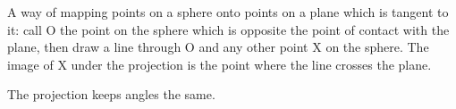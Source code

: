 A way of mapping points on a sphere onto points on a
plane which is tangent to it: call O the point on the 
sphere which is opposite the point of contact with the
plane, then draw a line through O and any other point X
on the sphere. The image of X under the projection is
the point where the line crosses the plane.
\par
The projection keeps angles the same.